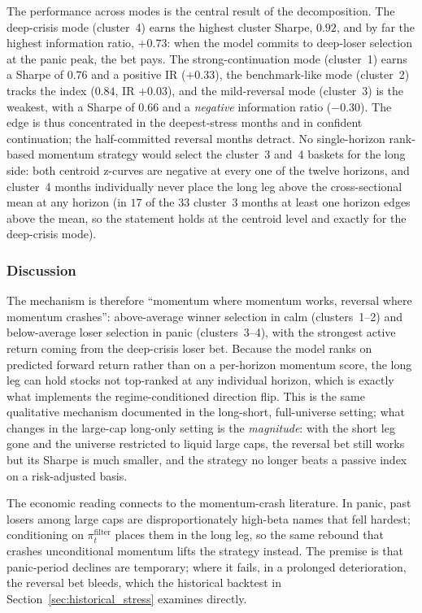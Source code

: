 The performance across modes is the central result of the decomposition. The deep-crisis mode (cluster~4) earns the highest cluster Sharpe, $0.92$, and by far the highest information ratio, $+0.73$: when the model commits to deep-loser selection at the panic peak, the bet pays. The strong-continuation mode (cluster~1) earns a Sharpe of $0.76$ and a positive IR ($+0.33$), the benchmark-like mode (cluster~2) tracks the index ($0.84$, IR $+0.03$), and the mild-reversal mode (cluster~3) is the weakest, with a Sharpe of $0.66$ and a \emph{negative} information ratio ($-0.30$). The edge is thus concentrated in the deepest-stress months and in confident continuation; the half-committed reversal months detract. No single-horizon rank-based momentum strategy would select the cluster~3 and~4 baskets for the long side: both centroid z-curves are negative at every one of the twelve horizons, and cluster~4 months individually never place the long leg above the cross-sectional mean at any horizon (in $17$ of the $33$ cluster~3 months at least one horizon edges above the mean, so the statement holds at the centroid level and exactly for the deep-crisis mode).

\subsubsection{Discussion}\label{sec:discussion}

The mechanism is therefore ``momentum where momentum works, reversal where momentum crashes'': above-average winner selection in calm (clusters~1--2) and below-average loser selection in panic (clusters~3--4), with the strongest active return coming from the deep-crisis loser bet. Because the model ranks on predicted forward return rather than on a per-horizon momentum score, the long leg can hold stocks not top-ranked at any individual horizon, which is exactly what implements the regime-conditioned direction flip. This is the same qualitative mechanism documented in the long-short, full-universe setting; what changes in the large-cap long-only setting is the \emph{magnitude}: with the short leg gone and the universe restricted to liquid large caps, the reversal bet still works but its Sharpe is much smaller, and the strategy no longer beats a passive index on a risk-adjusted basis.

The economic reading connects to the momentum-crash literature. In panic, past losers among large caps are disproportionately high-beta names that fell hardest; conditioning on $\pi_t^{\text{filter}}$ places them in the long leg, so the same rebound that crashes unconditional momentum \citep{DanielMoskowitz2016} lifts the strategy instead. The premise is that panic-period declines are temporary; where it fails, in a prolonged deterioration, the reversal bet bleeds, which the historical backtest in Section~\ref{sec:historical_stress} examines directly.


